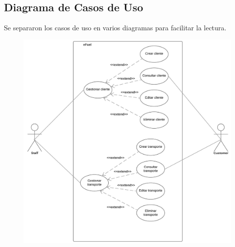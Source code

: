 \documentclass{article}
\begin{document}
    \subsection{Diagrama de Casos de Uso}
    Se separaron los casos de uso en varios diagramas para facilitar la lectura.
    
    \begin{figure}[H]
        \includegraphics[width=\textwidth]{cu1.jpeg}
        \centering
    \end{figure}
\end{document}
